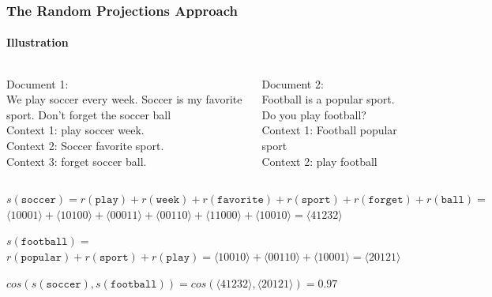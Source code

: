 \documentclass{beamer}
\begin{document}
\begin{frame}
	\frametitle{The Random Projections Approach}
	\framesubtitle{Illustration}
\begin{columns}[t]
\begin{column}{0.5\textwidth}
Document 1:\\
We play soccer every week. Soccer is my favorite sport. Don't forget the soccer ball\\
\medskip
Context 1: play soccer week.\\
Context 2: Soccer favorite sport.\\
Context 3: forget soccer ball.\\
\end{column}
\begin{column}{0.5\textwidth}
Document 2:\\
Football is a popular sport. Do you play football?\\
\medskip
Context 1: Football popular sport\\
Context 2: play football
\end{column}
\end{columns}
\bigskip
$s(\texttt{soccer}) = r(\texttt{play}) + r(\texttt{week}) + r(\texttt{favorite}) + r(\texttt{sport}) + r(\texttt{forget}) + r(\texttt{ball}) = $
$\langle 10001 \rangle + \langle 10100 \rangle + \langle 00011 \rangle+ \langle00110 \rangle+ \langle 11000 \rangle+ \langle 10010 \rangle = \langle 41232\rangle $

\medskip
$s(\texttt{football}) =$
$ r(\texttt{popular}) + r(\texttt{sport}) + r(\texttt{play}) = \langle 10010 \rangle + \langle 00110 \rangle + \langle 10001 \rangle = \langle 20121 \rangle$

\medskip
$cos(s(\texttt{soccer}), s(\texttt{football})) = cos(\langle 41232 \rangle, \langle 20121 \rangle) = 0.97$

\end{frame}
\end{document}

